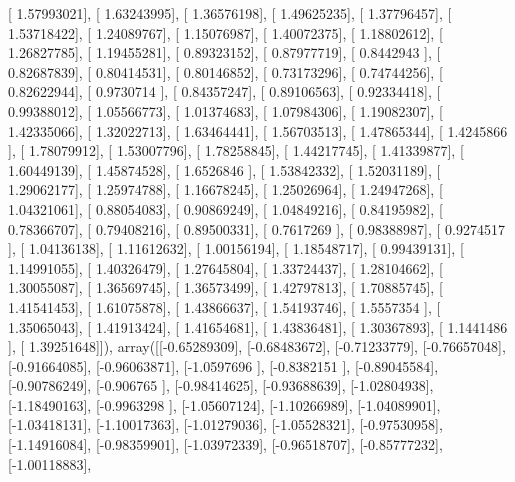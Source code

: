 \documentclass{article}
\begin{document}
       [ 1.57993021],
       [ 1.63243995],
       [ 1.36576198],
       [ 1.49625235],
       [ 1.37796457],
       [ 1.53718422],
       [ 1.24089767],
       [ 1.15076987],
       [ 1.40072375],
       [ 1.18802612],
       [ 1.26827785],
       [ 1.19455281],
       [ 0.89323152],
       [ 0.87977719],
       [ 0.8442943 ],
       [ 0.82687839],
       [ 0.80414531],
       [ 0.80146852],
       [ 0.73173296],
       [ 0.74744256],
       [ 0.82622944],
       [ 0.9730714 ],
       [ 0.84357247],
       [ 0.89106563],
       [ 0.92334418],
       [ 0.99388012],
       [ 1.05566773],
       [ 1.01374683],
       [ 1.07984306],
       [ 1.19082307],
       [ 1.42335066],
       [ 1.32022713],
       [ 1.63464441],
       [ 1.56703513],
       [ 1.47865344],
       [ 1.4245866 ],
       [ 1.78079912],
       [ 1.53007796],
       [ 1.78258845],
       [ 1.44217745],
       [ 1.41339877],
       [ 1.60449139],
       [ 1.45874528],
       [ 1.6526846 ],
       [ 1.53842332],
       [ 1.52031189],
       [ 1.29062177],
       [ 1.25974788],
       [ 1.16678245],
       [ 1.25026964],
       [ 1.24947268],
       [ 1.04321061],
       [ 0.88054083],
       [ 0.90869249],
       [ 1.04849216],
       [ 0.84195982],
       [ 0.78366707],
       [ 0.79408216],
       [ 0.89500331],
       [ 0.7617269 ],
       [ 0.98388987],
       [ 0.9274517 ],
       [ 1.04136138],
       [ 1.11612632],
       [ 1.00156194],
       [ 1.18548717],
       [ 0.99439131],
       [ 1.14991055],
       [ 1.40326479],
       [ 1.27645804],
       [ 1.33724437],
       [ 1.28104662],
       [ 1.30055087],
       [ 1.36569745],
       [ 1.36573499],
       [ 1.42797813],
       [ 1.70885745],
       [ 1.41541453],
       [ 1.61075878],
       [ 1.43866637],
       [ 1.54193746],
       [ 1.5557354 ],
       [ 1.35065043],
       [ 1.41913424],
       [ 1.41654681],
       [ 1.43836481],
       [ 1.30367893],
       [ 1.1441486 ],
       [ 1.39251648]]), array([[-0.65289309],
       [-0.68483672],
       [-0.71233779],
       [-0.76657048],
       [-0.91664085],
       [-0.96063871],
       [-1.0597696 ],
       [-0.8382151 ],
       [-0.89045584],
       [-0.90786249],
       [-0.906765  ],
       [-0.98414625],
       [-0.93688639],
       [-1.02804938],
       [-1.18490163],
       [-0.9963298 ],
       [-1.05607124],
       [-1.10266989],
       [-1.04089901],
       [-1.03418131],
       [-1.10017363],
       [-1.01279036],
       [-1.05528321],
       [-0.97530958],
       [-1.14916084],
       [-0.98359901],
       [-1.03972339],
       [-0.96518707],
       [-0.85777232],
       [-1.00118883],
\end{document}
